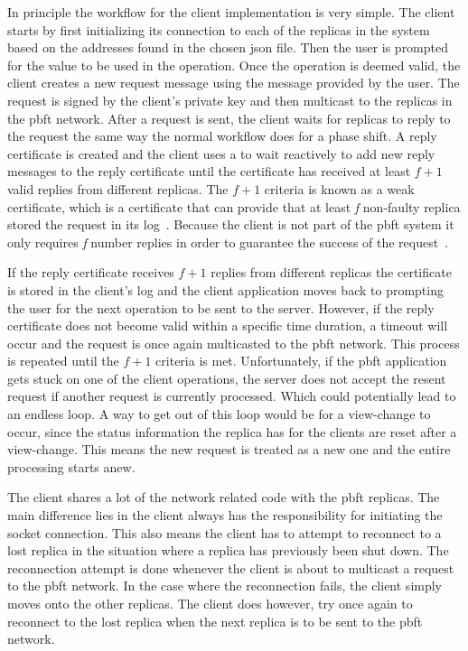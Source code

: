 In principle the workflow for the client implementation is very simple. The client starts by first initializing its connection to each of the replicas in the system based on the addresses found in the chosen \ac{json} file. Then the user is prompted for the value to be used in the operation. Once the operation is deemed valid, the client creates a new request message using the message provided by the user. The request is signed by the client's private key and then multicast to the replicas in the \ac{pbft} network. After a request is sent, the client waits for replicas to reply to the request the same way the normal workflow does for a phase shift. A reply certificate is created and the client uses a  to wait reactively to add new reply messages to the reply certificate until the certificate has received at least $f+1$ valid replies from different replicas. The $f+1$ criteria is known as a weak certificate, which is a certificate that can provide that at least \emph{f} non-faulty replica stored the request in its log~\cites[p.~9]{PAPER:PBFTRecovery}[p.~2]{PAPER:DPBFT}. Because the client is not part of the \ac{pbft} system it only requires \emph{f} number replies in order to guarantee the success of the request~\cites[p.~3]{PAPER:OGPBFT}[p.~9]{PAPER:PBFTRecovery}.

If the reply certificate receives $f+1$ replies from different replicas the certificate is stored in the client's log and the client application moves back to prompting the user for the next operation to be sent to the server. However, if the reply certificate does not become valid within a specific time duration, a timeout will occur and the request is once again multicasted to the \ac{pbft} network. This process is repeated until the $f+1$ criteria is met. Unfortunately, if the \ac{pbft} application gets stuck on one of the client operations, the server does not accept the resent request if another request is currently processed. Which could potentially lead to an endless loop. A way to get out of this loop would be for a view-change to occur, since the status information the replica has for the clients are reset after a view-change. This means the new request is treated as a new one and the entire processing starts anew.

The client shares a lot of the network related code with the \ac{pbft} replicas. The main difference lies in the client always has the responsibility for initiating the socket connection. This also means the client has to attempt to reconnect to a lost replica in the situation where a replica has previously been shut down. The reconnection attempt is done whenever the client is about to multicast a request to the \ac{pbft} network. In the case where the reconnection fails, the client simply moves onto the other replicas. The client does however, try once again to reconnect to the lost replica when the next replica is to be sent to the \ac{pbft} network. 

